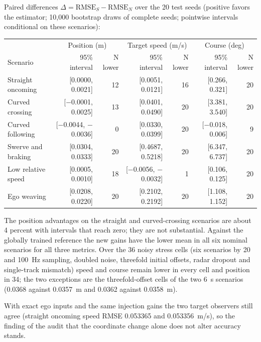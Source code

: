 \documentclass[11pt]{article}
\begin{document}
Paired differences $\Delta=\mathrm{RMSE}_S-\mathrm{RMSE}_N$ over the 20 test
seeds (positive favors the estimator; 10,000 bootstrap draws of complete
seeds; pointwise intervals conditional on these scenarios):
\begin{center}\small
\begin{tabular}{@{}lrrrrrr@{}}
\toprule
&\multicolumn{2}{c}{Position (m)}&\multicolumn{2}{c}{Target speed (m/s)}&\multicolumn{2}{c}{Course (deg)}\\
Scenario&95\% interval&N lower&95\% interval&N lower&95\% interval&N lower\\
\midrule
Straight oncoming&[0.0000, 0.0021]&12&[0.0051, 0.0121]&16&[0.266, 0.321]&20\\
Curved crossing&[$-$0.0001, 0.0025]&13&[0.0401, 0.0490]&20&[3.381, 3.540]&20\\
Curved following&[$-$0.0044, $-$0.0036]&0&[0.0330, 0.0399]&20&[$-$0.018, 0.006]&9\\
Swerve and braking&[0.0304, 0.0333]&20&[0.4687, 0.5218]&20&[6.347, 6.737]&20\\
Low relative speed&[0.0005, 0.0010]&18&[$-$0.0056, $-$0.0032]&1&[0.106, 0.125]&20\\
Ego weaving&[0.0208, 0.0220]&20&[0.2102, 0.2192]&20&[1.108, 1.152]&20\\
\bottomrule
\end{tabular}\end{center}
The position advantages on the straight and curved-crossing scenarios are
about 4 percent with intervals that reach zero; they are not substantial.
Against the globally trained reference the new gains have the lower mean in
all six nominal scenarios for all three metrics. Over the 36 noisy stress
cells (six scenarios by 20 and 100~Hz sampling, doubled noise, threefold
initial offsets, radar dropout and single-track mismatch) speed and course
remain lower in every cell and position in 34; the two exceptions are the
threefold-offset cells of the two 6~s scenarios (0.0368 against 0.0357~m and
0.0362 against 0.0358~m).

With exact ego inputs and the same injection gains the two target observers
still agree (straight oncoming speed RMSE 0.053365 and 0.053356~m/s), so the
finding of the audit that the coordinate change alone does not alter accuracy
stands.
\end{document}
